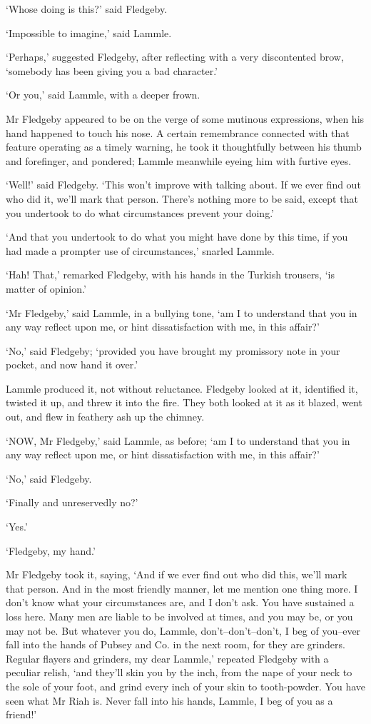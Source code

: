 ‘Whose doing is this?’ said Fledgeby.

‘Impossible to imagine,’ said Lammle.

‘Perhaps,’ suggested Fledgeby, after reflecting with a very discontented
brow, ‘somebody has been giving you a bad character.’

‘Or you,’ said Lammle, with a deeper frown.

Mr Fledgeby appeared to be on the verge of some mutinous expressions,
when his hand happened to touch his nose. A certain remembrance
connected with that feature operating as a timely warning, he took it
thoughtfully between his thumb and forefinger, and pondered; Lammle
meanwhile eyeing him with furtive eyes.

‘Well!’ said Fledgeby. ‘This won’t improve with talking about. If we
ever find out who did it, we’ll mark that person. There’s nothing more
to be said, except that you undertook to do what circumstances prevent
your doing.’

‘And that you undertook to do what you might have done by this time, if
you had made a prompter use of circumstances,’ snarled Lammle.

‘Hah! That,’ remarked Fledgeby, with his hands in the Turkish trousers,
‘is matter of opinion.’

‘Mr Fledgeby,’ said Lammle, in a bullying tone, ‘am I to understand that
you in any way reflect upon me, or hint dissatisfaction with me, in this
affair?’

‘No,’ said Fledgeby; ‘provided you have brought my promissory note in
your pocket, and now hand it over.’

Lammle produced it, not without reluctance. Fledgeby looked at it,
identified it, twisted it up, and threw it into the fire. They both
looked at it as it blazed, went out, and flew in feathery ash up the
chimney.

‘NOW, Mr Fledgeby,’ said Lammle, as before; ‘am I to understand that
you in any way reflect upon me, or hint dissatisfaction with me, in this
affair?’

‘No,’ said Fledgeby.

‘Finally and unreservedly no?’

‘Yes.’

‘Fledgeby, my hand.’

Mr Fledgeby took it, saying, ‘And if we ever find out who did this,
we’ll mark that person. And in the most friendly manner, let me mention
one thing more. I don’t know what your circumstances are, and I don’t
ask. You have sustained a loss here. Many men are liable to be involved
at times, and you may be, or you may not be. But whatever you do,
Lammle, don’t--don’t--don’t, I beg of you--ever fall into the hands of
Pubsey and Co. in the next room, for they are grinders. Regular flayers
and grinders, my dear Lammle,’ repeated Fledgeby with a peculiar relish,
‘and they’ll skin you by the inch, from the nape of your neck to the
sole of your foot, and grind every inch of your skin to tooth-powder.
You have seen what Mr Riah is. Never fall into his hands, Lammle, I beg
of you as a friend!’

